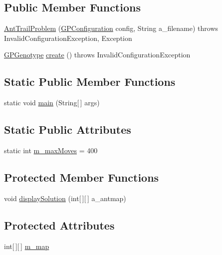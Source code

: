 \subsection*{Public Member Functions}
\begin{DoxyCompactItemize}
\item 
\hyperlink{classexamples_1_1gp_1_1anttrail_1_1_ant_trail_problem_ad8c75642f5ae87d1a2ab25e6f411c1e5}{Ant\-Trail\-Problem} (\hyperlink{classorg_1_1jgap_1_1gp_1_1impl_1_1_g_p_configuration}{G\-P\-Configuration} config, String a\-\_\-filename)  throws Invalid\-Configuration\-Exception, Exception 
\item 
\hyperlink{classorg_1_1jgap_1_1gp_1_1impl_1_1_g_p_genotype}{G\-P\-Genotype} \hyperlink{classexamples_1_1gp_1_1anttrail_1_1_ant_trail_problem_ad599d0c5965439a824fe20fd900348f2}{create} ()  throws Invalid\-Configuration\-Exception 
\end{DoxyCompactItemize}
\subsection*{Static Public Member Functions}
\begin{DoxyCompactItemize}
\item 
static void \hyperlink{classexamples_1_1gp_1_1anttrail_1_1_ant_trail_problem_a4412d4a6aee009a6ac2633e891e1c9e7}{main} (String\mbox{[}$\,$\mbox{]} args)
\end{DoxyCompactItemize}
\subsection*{Static Public Attributes}
\begin{DoxyCompactItemize}
\item 
static int \hyperlink{classexamples_1_1gp_1_1anttrail_1_1_ant_trail_problem_a6d71eb276ff0940142ab87cac220c45a}{m\-\_\-max\-Moves} = 400
\end{DoxyCompactItemize}
\subsection*{Protected Member Functions}
\begin{DoxyCompactItemize}
\item 
void \hyperlink{classexamples_1_1gp_1_1anttrail_1_1_ant_trail_problem_a62ef5a2c896b24cce83f8165756c2499}{display\-Solution} (int\mbox{[}$\,$\mbox{]}\mbox{[}$\,$\mbox{]} a\-\_\-antmap)
\end{DoxyCompactItemize}
\subsection*{Protected Attributes}
\begin{DoxyCompactItemize}
\item 
int\mbox{[}$\,$\mbox{]}\mbox{[}$\,$\mbox{]} \hyperlink{classexamples_1_1gp_1_1anttrail_1_1_ant_trail_problem_a0a48abbd71c41c8289e11b939905acc0}{m\-\_\-map}
\end{DoxyCompactItemize}
